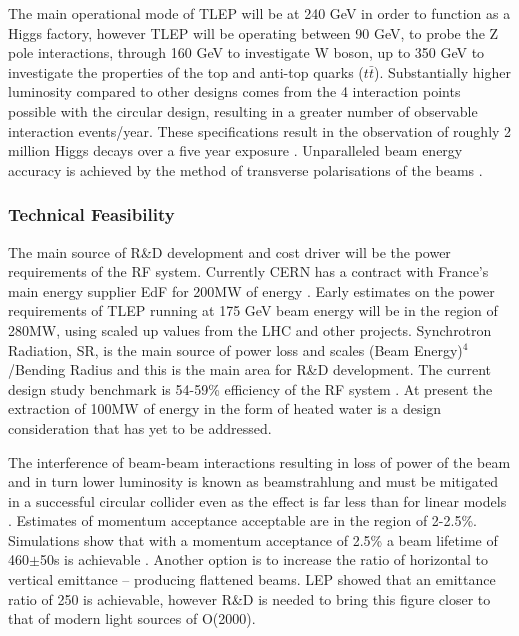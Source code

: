 The main operational mode of TLEP will be at 240 GeV in order to function as a Higgs factory, however TLEP will be operating between 90 GeV, to probe the Z pole interactions, through 160 GeV to investigate W boson, up to 350 GeV to investigate the properties of the top and anti-top quarks ($t\bar{t}$). Substantially higher luminosity compared to other designs comes from the 4 interaction points possible with the circular design, resulting in a greater number of observable interaction events/year. These specifications result in the observation of roughly 2 million Higgs decays over a five year exposure \cite{TLEP:CERNReport}. Unparalleled beam energy accuracy is achieved by the method of transverse polarisations of the beams \cite{TLEP:Review}.

\subsubsection{Technical Feasibility}

The main source of R\&D development and cost driver will be the power requirements of the RF system. Currently CERN has a contract with France’s main energy supplier EdF for 200MW of energy \cite{TLEP:Luminosity}. Early estimates on the power requirements of TLEP running at 175 GeV beam energy will be in the region of 280MW, using scaled up values from the LHC and other projects. Synchrotron Radiation, SR, is the main source of power loss and scales (Beam Energy)$^4$/Bending Radius and this is the main area for R\&D development. The current design study benchmark is 54-59\% efficiency of the RF system \cite{TLEP:Review}. At present the extraction of 100MW of energy in the form of heated water is a design consideration that has yet to be addressed.

The interference of beam-beam interactions resulting in loss of power of the beam and in turn lower luminosity is known as beamstrahlung and must be mitigated in a successful circular collider even as the effect is far less than for linear models \cite{TLEP:Luminosity}. Estimates of momentum acceptance acceptable are in the region of 2-2.5\%. Simulations show that with a momentum acceptance of 2.5\% a beam lifetime of 460$\pm$50s is achievable \cite{TLEP:EnergyRestriction}. Another option is to increase the ratio of horizontal to vertical emittance – producing flattened beams. LEP showed that an emittance ratio of 250 is achievable, however R\&D is needed to bring this figure closer to that of modern light sources of O(2000).

